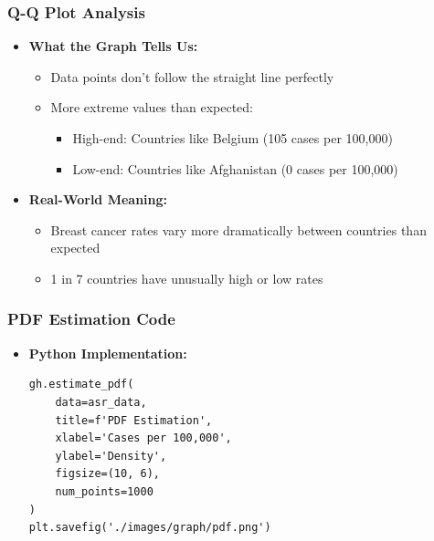 \begin{frame}
    \frametitle{Q-Q Plot Analysis}
    \begin{itemize}
        \item \textbf{What the Graph Tells Us:}
        \begin{itemize}
            \item Data points don't follow the straight line perfectly
            \item More extreme values than expected:
                  \begin{itemize}
                      \item High-end: Countries like Belgium (105 cases per 100,000)
                      \item Low-end: Countries like Afghanistan (0 cases per 100,000)
                  \end{itemize}
        \end{itemize}
        
        \item \textbf{Real-World Meaning:}
        \begin{itemize}
            \item Breast cancer rates vary more dramatically between countries than expected
            \item 1 in 7 countries have unusually high or low rates
        \end{itemize}
    \end{itemize}
\end{frame}

\begin{frame}[fragile]
    \frametitle{PDF Estimation Code}
    \begin{itemize}
        \item \textbf{Python Implementation:}
        \begin{lstlisting}
gh.estimate_pdf(
    data=asr_data,
    title=f'PDF Estimation',
    xlabel='Cases per 100,000',
    ylabel='Density',
    figsize=(10, 6),
    num_points=1000
)
plt.savefig('./images/graph/pdf.png')
        \end{lstlisting}
    \end{itemize}
\end{frame}

